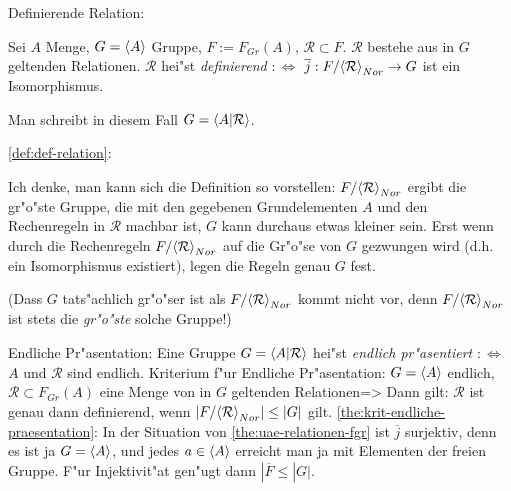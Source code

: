  Definierende Relation:{
  \label{def:def-relation}
  Sei $A$ Menge, $G={\left\langle A\right\rangle}$ Gruppe, $F:=F_{Gr}(A)$, $\mathcal R\subset F$.
  $\mathcal R$ bestehe aus in $G$ geltenden Relationen. $\mathcal R$ hei"st
  \emph{definierend} $:\iff$ $\overline j:F/{\left\langle\mathcal R\right\rangle}_{Nor} \to G$
  ist ein Isomorphismus.
  
  Man schreibt in diesem Fall $G={\left\langle A|\mathcal R\right\rangle}$.
  }
\annotation \ref{def:def-relation}:{
  Ich denke, man kann sich die Definition so vorstellen: 
  $F/{\left\langle\mathcal R\right\rangle}_{Nor}$ ergibt die gr"o"ste Gruppe, die mit den
  gegebenen Grundelementen $A$ und den Rechenregeln in $\mathcal R$ 
  machbar ist, $G$ kann durchaus etwas kleiner sein. Erst wenn
  durch die Rechenregeln $F/{\left\langle\mathcal R\right\rangle}_{Nor}$ auf die Gr"o"se
  von $G$ gezwungen wird (d.h. ein Isomorphismus existiert), 
  legen die Regeln genau $G$ fest.
  
  (Dass $G$ tats"achlich gr"o"ser ist als $F/{\left\langle\mathcal R\right\rangle}_{Nor}$
  kommt nicht vor, denn $F/{\left\langle\mathcal R\right\rangle}_{Nor}$ ist stets die
  \emph{gr"o"ste} solche Gruppe!)
  }
 Endliche Pr"asentation:{
  Eine Gruppe $G={\left\langle A|\mathcal R\right\rangle}$ hei"st \emph{endlich pr"asentiert} $:\iff$
  $A$ und $\mathcal R$ sind endlich.
  }
\theorem Kriterium f"ur Endliche Pr"asentation:
  $G={\left\langle A\right\rangle}$ endlich, 
  $\mathcal R\subset F_{Gr}(A)$ eine Menge von in $G$ geltenden Relationen=>{
  \label{the:krit-endliche-praesentation}
  Dann gilt: $\mathcal R$ ist genau dann definierend, wenn 
  $|F/ {\left\langle\mathcal R\right\rangle}_{Nor}|\leq |G|$ gilt.
  }
\proof \ref{the:krit-endliche-praesentation}:{
  In der Situation von \ref{the:uae-relationen-fgr} ist $\overline j$
  surjektiv, denn es ist ja $G={\left\langle A\right\rangle}$, und jedes $a\in{\left\langle A\right\rangle}$ erreicht
  man ja mit Elementen der freien Gruppe. F"ur Injektivit"at gen"ugt dann
  $|\overline F\leq | G|$.
  }
